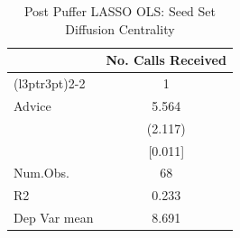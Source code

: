 \begin{table}
\centering
\caption{Post Puffer LASSO OLS: Seed Set Diffusion Centrality}
\centering
\begin{tabular}[t]{lc}
\toprule
\multicolumn{1}{c}{ } & \multicolumn{1}{c}{No. Calls Received} \\
\cmidrule(l{3pt}r{3pt}){2-2}
  & 1\\
\midrule
Advice & \num{5.564}\\
 & (\num{2.117})\\
 & {}[\num{0.011}]\\
\midrule
Num.Obs. & \num{68}\\
R2 & \num{0.233}\\
Dep Var mean & \num{8.691}\\
\bottomrule
\end{tabular}
\end{table}
